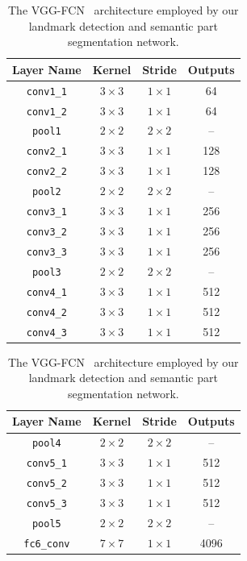 \begin{table}
  \caption[Layers of VGG-FCN]{The
    VGG-FCN~\cite{simonyan2014vgg,long2015fully} architecture employed
    by our landmark detection and semantic part segmentation network.}
\label{tab:archlist}
\centering
\small
\begin{tabular}{|c|c|c|c|}
\hline
Layer Name           & Kernel       & Stride       &  Outputs  \\
\hline\hline
\texttt{conv1\_1}    & $3 \times 3$ & $1 \times 1$ &  64  \\
\texttt{conv1\_2}    & $3 \times 3$ & $1 \times 1$ &  64  \\
\texttt{pool1}       & $2 \times 2$ & $2 \times 2$ &  --  \\
\texttt{conv2\_1}    & $3 \times 3$ & $1 \times 1$ &  128 \\
\texttt{conv2\_2}    & $3 \times 3$ & $1 \times 1$ &  128 \\
\texttt{pool2}       & $2 \times 2$ & $2 \times 2$ &  --  \\
\texttt{conv3\_1}    & $3 \times 3$ & $1 \times 1$ &  256 \\
\texttt{conv3\_2}    & $3 \times 3$ & $1 \times 1$ &  256 \\
\texttt{conv3\_3}    & $3 \times 3$ & $1 \times 1$ &  256 \\
\texttt{pool3}       & $2 \times 2$ & $2 \times 2$ &  --  \\
\texttt{conv4\_1}    & $3 \times 3$ & $1 \times 1$ & 512  \\
\texttt{conv4\_2}    & $3 \times 3$ & $1 \times 1$ & 512  \\
\texttt{conv4\_3}    & $3 \times 3$ & $1 \times 1$ & 512  \\
\hline
\end{tabular}
\begin{tabular}{|c|c|c|c|}
\hline
Layer Name           & Kernel       & Stride       &  Outputs  \\
\hline\hline
\texttt{pool4}       & $2 \times 2$ & $2 \times 2$ & --   \\
\texttt{conv5\_1}    & $3 \times 3$ & $1 \times 1$ & 512  \\
\texttt{conv5\_2}    & $3 \times 3$ & $1 \times 1$ & 512  \\
\texttt{conv5\_3}    & $3 \times 3$ & $1 \times 1$ & 512  \\
\texttt{pool5}       & $2 \times 2$ & $2 \times 2$ & --   \\
\texttt{fc6\_conv}   & $7 \times 7$ & $1 \times 1$ & 4096 \\

\end{tabular}
\end{table}
